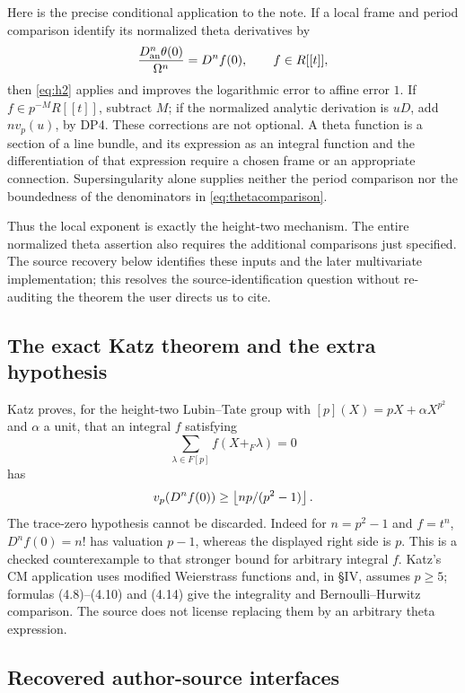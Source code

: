 \documentclass[11pt,a4paper]{article}
\theoremstyle{definition}\newtheorem{remark}[theorem]{Remark}
\newcommand{\vp}{v_p}\newcommand{\dR}{\mathrm{dR}}\newcommand{\crys}{\mathrm{crys}}
\begin{document}
Here is the precise conditional application to the note. If a local frame and period comparison identify its normalized theta derivatives by
\begin{equation}\label{eq:thetacomparison}
 \frac{D_{\rm an}^n\theta(0)}{\Omega^n}=D^nf(0),\qquad f\in R[[t]],
\end{equation}
then \eqref{eq:h2} applies and improves the logarithmic error to affine error $1$. If $f\in p^{-M}R[[t]]$, subtract $M$; if the normalized analytic derivation is $uD$, add $n\vp(u)$, by DP4. These corrections are not optional. A theta function is a section of a line bundle, and its expression as an integral function and the differentiation of that expression require a chosen frame or an appropriate connection. Supersingularity alone supplies neither the period comparison nor the boundedness of the denominators in \eqref{eq:thetacomparison}.

Thus the local exponent is exactly the height-two mechanism. The entire normalized theta assertion also requires the additional comparisons just specified. The source recovery below identifies these inputs and the later multivariate implementation; this resolves the source-identification question without re-auditing the theorem the user directs us to cite.

\subsection{The exact Katz theorem and the extra hypothesis}

Katz \cite[Main Theorem 3.11(I), p.~672]{Katz81} proves, for the height-two Lubin--Tate group with $[p](X)=pX+\alpha X^{p^2}$ and $\alpha$ a unit, that an integral $f$ satisfying
\[
 \sum_{\lambda\in F[p]}f(X+_F\lambda)=0
\]
has
\[
 \vp(D^nf(0))\ge\floor{np/(p^2-1)}.
\]
The trace-zero hypothesis cannot be discarded. Indeed for $n=p^2-1$ and $f=t^n$, $D^nf(0)=n!$ has valuation $p-1$, whereas the displayed right side is $p$. This is a checked counterexample to that stronger bound for arbitrary integral $f$. Katz's CM application uses modified Weierstrass functions and, in \S IV, assumes $p\ge5$; formulas (4.8)--(4.10) and (4.14) give the integrality and Bernoulli--Hurwitz comparison. The source does not license replacing them by an arbitrary theta expression.

\subsection{Recovered author-source interfaces}\label{sec:recovered}
\end{document}
